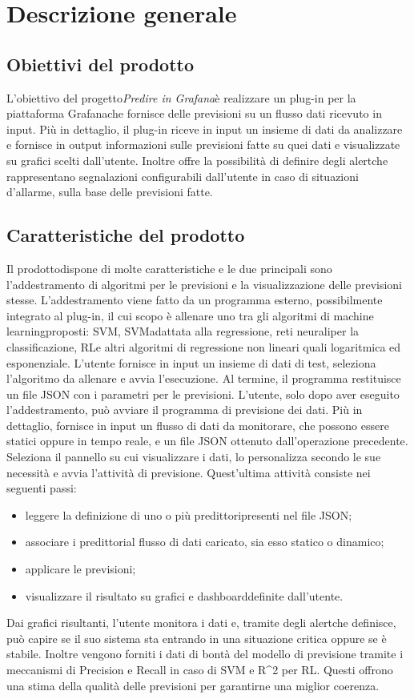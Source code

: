 \section{Descrizione generale}
	\subsection{Obiettivi del prodotto}
	L'obiettivo del progetto\glosp \textit{Predire in Grafana}\glosp è realizzare un plug-in per la piattaforma Grafana\glosp che fornisce delle previsioni su un flusso dati ricevuto in input.
	Più in dettaglio, il plug-in riceve in input un insieme di dati da analizzare e fornisce in output informazioni sulle previsioni fatte su quei dati e visualizzate su grafici scelti dall'utente. Inoltre offre la possibilità di definire degli alert\glosp che rappresentano segnalazioni configurabili dall'utente in caso di situazioni d'allarme, sulla base delle previsioni fatte. 
	\subsection{Caratteristiche del prodotto}
	Il prodotto\glosp dispone di molte caratteristiche e le due principali sono l'addestramento di algoritmi per le previsioni e la visualizzazione delle previsioni stesse.
	L'addestramento viene fatto da un programma esterno, possibilmente integrato al plug-in, il cui scopo è allenare uno tra gli algoritmi di machine learning\glosp proposti: SVM\glo, SVM\glosp adattata alla regressione, reti neurali\glosp per la classificazione, RL\glosp e altri algoritmi di regressione non lineari quali logaritmica ed esponenziale. L'utente fornisce in input un insieme di dati di test, seleziona l'algoritmo da allenare e avvia l'esecuzione. Al termine, il programma restituisce un file JSON con i parametri per le previsioni.
	L'utente, solo dopo aver eseguito l'addestramento, può avviare il programma di previsione dei dati. Più in dettaglio, fornisce in input un flusso di dati da monitorare, che possono essere statici oppure in tempo reale, e un file JSON ottenuto dall'operazione precedente. Seleziona il pannello su cui visualizzare i dati, lo personalizza secondo le sue necessità e avvia l'attività di previsione. Quest'ultima attività consiste nei seguenti passi:
	\begin{itemize}
		\item leggere la definizione di uno o più predittori\glosp presenti nel file JSON;
		\item associare i predittori\glosp al flusso di dati caricato, sia esso statico o dinamico;
		\item applicare le previsioni;
		\item visualizzare il risultato su grafici e dashboard\glosp definite dall'utente.
	\end{itemize}
	Dai grafici risultanti, l'utente monitora i dati e, tramite degli alert\glosp che definisce, può capire se il suo sistema sta entrando in una situazione critica oppure se è stabile.
	Inoltre vengono forniti i dati di bontà del modello di previsione tramite i meccanismi di Precision e Recall in caso di SVM e R\^{}2 per RL\glo. Questi offrono una stima della qualità delle previsioni per garantirne una miglior coerenza.
